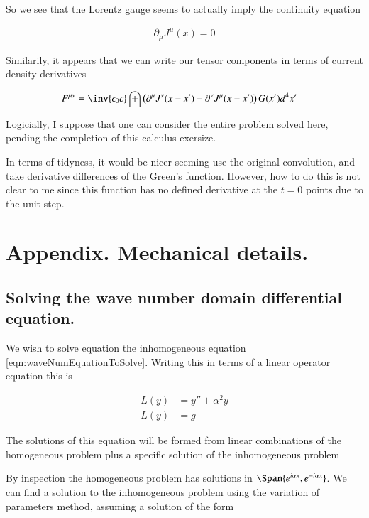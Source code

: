 \documentclass{article}
\begin{document}
So we see that the Lorentz gauge seems to actually imply the continuity equation

\begin{align*}
\partial_\mu J^\mu(x) = 0
\end{align*}

Similarily, it appears that we can write our tensor components in terms of current density derivatives

\begin{align}
F^{\mu\nu} 
&= \inv{\epsilon_0 c} \int \left(\partial^\mu J^\nu(x - x') - \partial^\nu J^\mu(x - x') \right) G(x') d^4 x'
\end{align}

Logicially, I suppose that one can consider the entire problem solved here, pending the completion of this calculus exersize.

In terms of tidyness, it would be nicer seeming use the original convolution, and take derivative differences of the Green's
function.  However, how to do this is not clear to me since this function has no defined derivative
at the $t=0$ points due to the unit step.

\section{ Appendix.  Mechanical details. }

\subsection{ Solving the wave number domain differential equation. }

We wish to solve equation the inhomogeneous equation \ref{eqn:waveNumEquationToSolve}.  Writing this in terms of a linear operator equation this is

\begin{align*}
L(y) &= y'' + \alpha^2 y \\
L(y) &= g
\end{align*}

The solutions of this equation will be formed from linear combinations of the homogeneous problem plus a specific solution of the inhomogeneous problem

By inspection the homogeneous problem has solutions in $\Span \{ e^{ i \alpha x }, e^{ -i \alpha x }\}$.
We can find a solution to the inhomogeneous problem using the variation of parameters method, assuming a solution of the form
\end{document}
